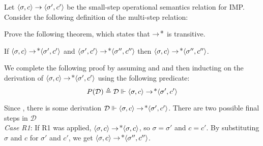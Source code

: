 \documentclass[11pt]{article}
\begin{document}
\begin{exercise}
Let $\CONFIG{\sigma}{c} \stepsone \CONFIG{\sigma'}{c'}$ be the
small-step operational semantics relation for IMP. Consider the
following definition of the multi-step relation:

\begin{mathpar}

\end{mathpar}

\noindent Prove the following theorem, which states that
$\stepsone\kleenestar$ is transitive.

\begin{theorem*} If \( \CONFIG{\sigma}{c} \stepsone\kleenestar
\CONFIG{\sigma'}{c'} \) and \( \CONFIG{\sigma'}{c'}
\stepsone\kleenestar \CONFIG{\sigma''}{c''} \) then \(
\CONFIG{\sigma}{c} \stepsone\kleenestar \CONFIG{\sigma''}{c''} \).
\end{theorem*}


We complete the following proof by assuming \stepsone\kleenestar{} and \stepsone\kleenestar{} and then inducting on the derivation of \( \CONFIG{\sigma}{c} \stepsone\kleenestar
\CONFIG{\sigma'}{c'} \) using the following predicate: \\

$$P(\mathcal{D}) \triangleq \mathcal{D} \Vdash \CONFIG{\sigma}{c} \stepsone\kleenestar \CONFIG{\sigma'}{c'}$$ 

Since  \stepsone\kleenestar {}, there is some derivation $\mathcal{D} \Vdash \CONFIG{\sigma}{c} \stepsone\kleenestar \CONFIG{\sigma'}{c'}$. There are two possible final steps in $\mathcal{D}$ \\

{\it Case R1}:
If R1 was applied, \( \CONFIG{\sigma}{c} \stepsone\kleenestar \CONFIG{\sigma}{c} \), so $\sigma = \sigma'$ and $c = c'$. By substituting $\sigma$ and $c$ for $\sigma'$ and $c'$, we get  \(
\CONFIG{\sigma}{c} \stepsone\kleenestar \CONFIG{\sigma''}{c''} \). \checkmark \\


\end{exercise}
\end{document}
